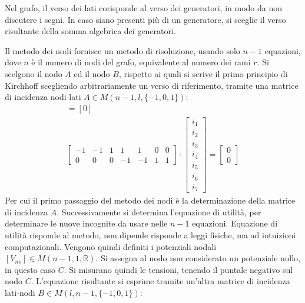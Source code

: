 \documentclass{article}
\numberwithin{equation}{subsection}
\begin{document}
Nel grafo, il verso dei lati corisponde al verso dei generatori, in modo da non discutere i segni. In caso siano presenti più di un generatore, si sceglie il verso risultante 
della somma algebrica dei generatori. %



Il metodo dei nodi fornisce un metodo di risoluzione, usando solo $n-1$ equazioni, dove $n$ è il numero di nodi del grafo, equivalente al numero dei rami $r$. 
Si scelgono il nodo $A$ ed il nodo $B$, rispetto ai quali si scrive il primo principio di Kirchhoff scegliendo arbitrariamente un verso di riferimento, tramite una matrice di 
incidenza nodi-lati $A\in M(n-1,l,\{-1,0,1\})$:
\begin{gather*}
    [A][i_l]=[0]\\
    \begin{bmatrix}
        -1&-1&1&1&1&0&0\\
        0&0&0&-1&-1&1&1
    \end{bmatrix}\cdot\begin{bmatrix}
        i_1\\
        i_2\\
        i_3\\
        i_4\\
        i_5\\
        i_6\\
        i_7
    \end{bmatrix}=\begin{bmatrix}
        0\\
        0
    \end{bmatrix}
\end{gather*}
Per cui il primo passaggio del metodo dei nodi è la determinazione della matrice di incidenza $A$. Successivamente si determina l'equazione di utilità, per determinare le nuove 
incognite da usare nelle $n-1$ equazioni. Equazione di utilità risponde al metodo, non dipende risponde a leggi fisiche, ma ad intuizioni computazionali. 
Vengono quindi definiti i potenziali nodali $[V_{no}]\in M(n-1,1,\mathbb{R})$. Si assegna al nodo non considerato un potenziale nullo, in questo caso $C$. 
Si misurano quindi le tensioni, tenendo il puntale negativo sul nodo $C$. L'equazione risultante si esprime tramite un'altra matrice di incidenza lati-nodi $B\in M(l,n-1,\{-1,0,1\})$: 
\end{document}
